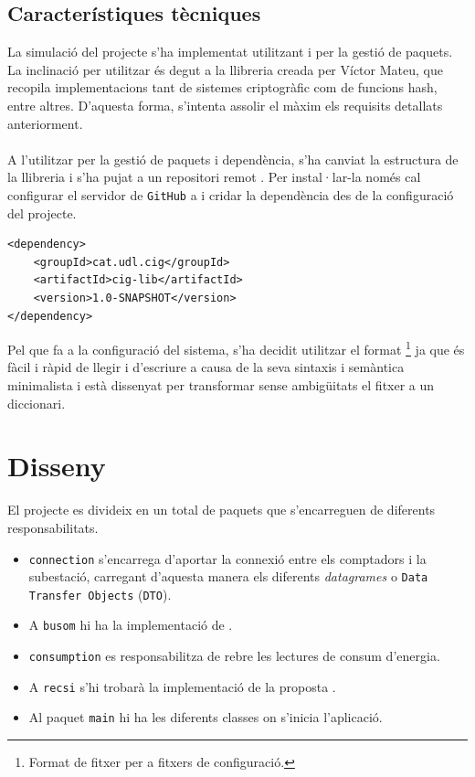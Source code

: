 \subsection{Característiques tècniques}
La simulació del projecte s'ha implementat utilitzant \texttt{\java} i \texttt{\mavenLarge} per la gestió de paquets. La inclinació per utilitzar \texttt{\java} és degut a la llibreria \ciglib creada per Víctor Mateu, que recopila implementacions tant de sistemes criptogràfic com de funcions hash, entre altres. D'aquesta forma, s'intenta assolir el màxim els requisits detallats anteriorment.
\\
\\
A l'utilitzar \maven per la gestió de paquets i dependència, s'ha canviat la estructura de la llibreria i s'ha pujat a un repositori remot \cite{ciglib}. Per instal·lar-la només cal configurar el servidor de \texttt{GitHub} a \maven i cridar la dependència des de la configuració del projecte.
\lstset{language=xml}
\begin{lstlisting}
<dependency>
	<groupId>cat.udl.cig</groupId>
	<artifactId>cig-lib</artifactId>
	<version>1.0-SNAPSHOT</version>
</dependency>
\end{lstlisting}
Pel que fa a la configuració del sistema, s'ha decidit utilitzar el format \toml\footnote{Format de fitxer per a fitxers de configuració.} ja que és fàcil i ràpid de llegir i d'escriure a causa de la seva sintaxis i semàntica minimalista i està dissenyat per transformar sense ambigüitats el fitxer a un diccionari.
\section{Disseny}
El projecte es divideix en un total de  paquets que s'encarreguen de diferents responsabilitats.
\begin{itemize}
	\item \texttt{connection} s'encarrega d'aportar la connexió entre els comptadors i la subestació, carregant d'aquesta manera els diferents \textit{datagrames} o  \texttt{Data Transfer Objects} (\texttt{DTO}).
	\item A \texttt{busom} hi ha la implementació de \cite{busom}.
	\item \texttt{consumption} es responsabilitza de rebre les lectures de consum d'energia.
	\item A \texttt{recsi} s'hi trobarà la implementació de la proposta \cite{recsi}.
	\item Al paquet \texttt{main} hi ha les diferents classes on s'inicia l'aplicació. \label{list:packages}
\end{itemize}
